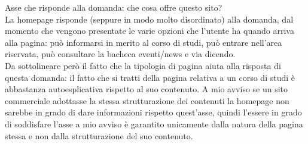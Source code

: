 Asse che risponde alla domanda: che cosa offre questo sito? \\
La homepage risponde (seppure in modo molto disordinato) alla domanda, dal momento che vengono presentate le varie opzioni che l'utente ha quando arriva alla pagina: può informarsi in merito al corso di studi, può entrare nell'area riservata, può consultare la bacheca eventi/news e via dicendo. \\
Da sottolineare però il fatto che la tipologia di pagina aiuta alla risposta di questa domanda: il fatto che si tratti della pagina relativa a un corso di studi è abbastanza autoesplicativa rispetto al suo contenuto. A mio avviso se un sito commerciale adottasse la stessa strutturazione dei contenuti la homepage non sarebbe in grado di dare informazioni rispetto quest'asse, quindi l'essere in grado di soddisfare l'asse a mio avviso è garantito unicamente dalla natura della pagina stessa e non dalla strutturazione del suo contenuto.